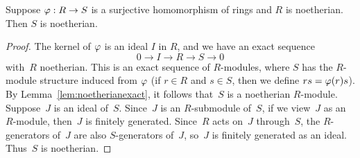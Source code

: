 \begin{lemma}\label{lem:surjnoetherian}
	Suppose $\varphi:R\to S$ is a surjective homomorphism of
	rings and $R$ is noetherian. Then $S$ is noetherian.
\end{lemma}
\begin{proof}
	The kernel of $\varphi$ is an ideal $I$ in $R$, and
	we have an exact sequence
	$$
		0 \to I \to R \to S \to 0
	$$
	with~$R$ noetherian.
	This is an exact sequence of $R$-modules, where $S$ has the
	$R$-module structure induced from $\varphi$ (if $r\in R$
	and $s\in S$, then we define $rs = \varphi(r)s$).
	By Lemma~\ref{lem:noetherianexact}, it follows
	that~$S$ is a noetherian $R$-module. Suppose~$J$ is an ideal of~$S$.
	Since~$J$ is an $R$-submodule of~$S$, if we view~$J$ as an $R$-module,
	then~$J$ is finitely generated. Since~$R$ acts on~$J$ through~$S$,
	the $R$-generators of~$J$ are also $S$-generators of~$J$, so~$J$
	is finitely generated as an ideal. Thus~$S$ is noetherian.
\end{proof}

